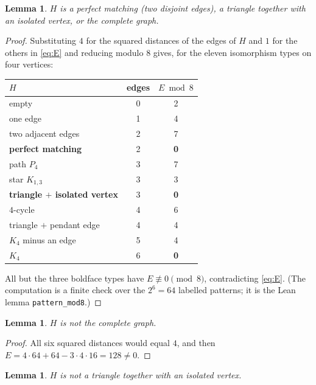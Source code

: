 \documentclass[11pt]{article}
\theoremstyle{plain}
\newtheorem{lemma}[theorem]{Lemma}
\theoremstyle{definition}
\theoremstyle{remark}
\begin{document}
\begin{lemma}\label{lem:mod8}
$H$ is a perfect matching (two disjoint edges), a triangle together with an
isolated vertex, or the complete graph.
\end{lemma}

\begin{proof}
Substituting $4$ for the squared distances of the edges of $H$ and $1$ for the
others in \eqref{eq:E} and reducing modulo $8$ gives, for the eleven isomorphism
types on four vertices:

\begin{center}
\begin{tabular}{lcc}
\toprule
$H$ & edges & $E \bmod 8$\\
\midrule
empty                       & 0 & 2\\
one edge                    & 1 & 4\\
two adjacent edges          & 2 & 7\\
\textbf{perfect matching}   & 2 & \textbf{0}\\
path $P_4$                  & 3 & 7\\
star $K_{1,3}$              & 3 & 3\\
\textbf{triangle $+$ isolated vertex} & 3 & \textbf{0}\\
$4$-cycle                   & 4 & 6\\
triangle $+$ pendant edge   & 4 & 4\\
$K_4$ minus an edge         & 5 & 4\\
\textbf{$K_4$}              & 6 & \textbf{0}\\
\bottomrule
\end{tabular}
\end{center}

All but the three boldface types have $E\not\equiv0\pmod 8$, contradicting
\eqref{eq:E}. (The computation is a finite check over the $2^6=64$ labelled
patterns; it is the Lean lemma \texttt{pattern\_mod8}.) \end{proof}

\begin{lemma}\label{lem:k4}
$H$ is not the complete graph.
\end{lemma}

\begin{proof}
All six squared distances would equal $4$, and then
$E=4\cdot64+64-3\cdot4\cdot16=128\ne0$. \end{proof}

\begin{lemma}\label{lem:tri}
$H$ is not a triangle together with an isolated vertex.
\end{lemma}
\end{document}
